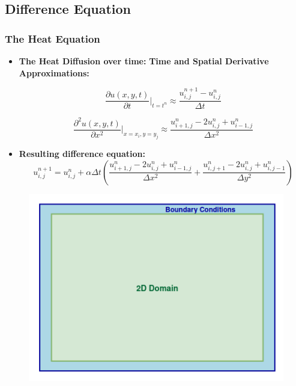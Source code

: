 \documentclass[9pt]{beamer}
\begin{document}
\subsection{Difference Equation}
\begin{frame}
\vspace{-0.1\baselineskip} %

\frametitle{The Heat Equation}
\scriptsize
\begin{itemize}
    \item \textbf{The Heat Diffusion over time:}
\newline %
\textbf{Time and Spatial Derivative Approximations:}
\newline
\begin{minipage}{0.45\textwidth}

     \[
\frac{\partial u(x, y, t)}{\partial t}\Bigg|_{t = t^n} \approx \frac{u_{i,j}^{n+1} - u_{i,j}^n}{\Delta t}
\]
\end{minipage}
\begin{minipage}{0.45\textwidth}

\[
\frac{\partial^2 u(x, y, t)}{\partial x^2}\Bigg|_{x = x_i, y = y_j} \approx \frac{u_{i+1,j}^n - 2u_{i,j}^n + u_{i-1,j}^n}{\Delta x^2}
\]
\end{minipage}
\item \textbf{Resulting difference equation:}
\[
u_{i,j}^{n+1} = u_{i,j}^n + \alpha \Delta t \left( \frac{u_{i+1,j}^n - 2u_{i,j}^n + u_{i-1,j}^n}{\Delta x^2} + \frac{u_{i,j+1}^n - 2u_{i,j}^n + u_{i,j-1}^n}{\Delta y^2} \right)
\]
\end{itemize}
\vspace{-0.5\baselineskip}
\begin{figure}
    \centering
    \includegraphics[width=0.50\linewidth,height=0.30\linewidth]{Screenshot from 2024-08-30 14-04-56.png}
\end{figure}
\end{frame}
\end{document}
